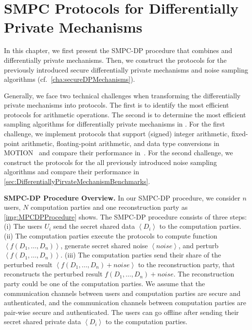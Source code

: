\chapter{SMPC Protocols for Differentially Private Mechanisms}
\label{cha:MPCProtocolsforDifferentiallyPrivateMechanisms}

In this chapter, we first present the SMPC-DP procedure that combines \smpc and differentially private mechanisms.
Then, we construct the \smpc protocols for the previously introduced secure differentially private mechanisms and noise sampling algorithms (cf.~\autoref{cha:secureDPMechanisms}).

Generally, we face two technical challenges when transforming the differentially private mechanisms into \smpc protocols.
The first is to identify the most efficient \smpc protocols for arithmetic operations.
The second is to determine the most efficient sampling algorithms for differentially private mechanisms in \smpc.
For the first challenge, we implement \smpc protocols that support (signed) integer arithmetic, fixed-point arithmetic, floating-point arithmetic, and data type conversions in MOTION~\cite{braun2022motion} and compare their performance in~\cite{sec:ArithmeticOperationsPerformanceEvaluation}.
For the second challenge, we construct the \smpc protocols for the all previously introduced noise sampling algorithms and compare their performance in \autoref{sec:DifferentiallyPirvateMechanismBenchmarks}.

\textbf{SMPC-DP Procedure Overview.}
In our SMPC-DP procedure, we consider $n$ users, $N$ computation parties and one reconstruction party as \autoref{img:MPCDPProcedure} shows.
The SMPC-DP procedure consists of three steps:
(i) The users $U_i$ send the secret shared data $\left\langle D_i\right\rangle $ to the computation parties.
(ii) The computation parties execute the \smpc protocols to compute function $\left\langle f\left(D_1,\ldots, D_n\right) \right\rangle $, generate secret shared noise $\left\langle noise\right\rangle $, and perturb $\left\langle f\left(D_1,\ldots, D_n\right) \right\rangle $.
(iii) The computation parties send their share of the perturbed result $\left\langle f\left(D_1,\ldots, D_n\right) +noise\right\rangle$ to the reconstruction party, that reconstructs the perturbed result $f\left(D_1,\ldots, D_n\right) +noise$.
The reconstruction party could be one of the computation parties. We assume that the communication channels between users and computation parties are secure and authenticated, and the communication channels between computation parties are pair-wise secure and authenticated. The users can go offline after sending their secret shared private data $\left\langle D_i\right\rangle $ to the computation parties.

